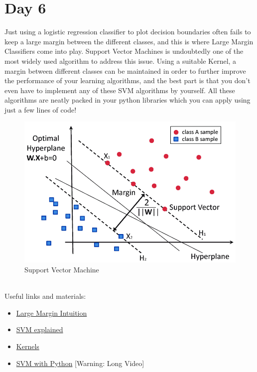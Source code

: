\documentclass[11pt]{article}
\begin{document}
\section{Day 6}
Just using a logistic regression classifier to plot decision boundaries often fails to keep a large margin between the different classes, and this is where Large Margin Classifiers come into play. Support Vector Machines is undoubtedly one of the most widely used algorithm to address this issue. Using a suitable Kernel, a margin between different classes can be maintained in order to further improve the performance of your learning algorithms, and the best part is that you don't even have to implement any of these SVM algorithms by yourself. All these algorithms are neatly packed in your python libraries which you can apply using just a few lines of code!
\begin{figure}[h!]
\begin{center}
\includegraphics[scale=.45]{img/svm.png}
{\caption*{Support Vector Machine}}
\end{center}
\end{figure}\\
Useful links and materials:
\begin{itemize}
\item \href{https://www.youtube.com/watch?v=Ccje1EzrXBU}{Large Margin Intuition}
\item \href{https://www.youtube.com/watch?v=efR1C6CvhmE}{SVM explained}
\item \href{https://www.youtube.com/watch?v=mTyT-oHoivA}{Kernels}
\item \href{https://www.youtube.com/watch?v=7sz4WpkUIIs}{SVM with Python} [Warning: Long Video]
\end{itemize}
\pagebreak
\end{document}
